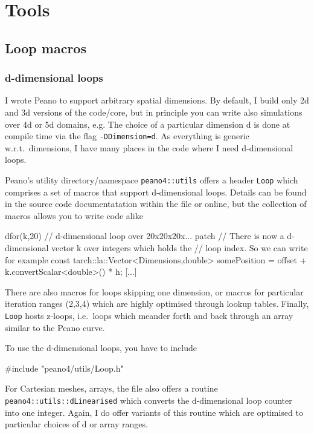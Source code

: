 \chapter{Tools}
\label{section:tools}


\section{Loop macros}

\subsection{d-dimensional loops}

I wrote Peano to support arbitrary spatial dimensions.
By default, I build only 2d and 3d versions of the code/core, but in principle
you can write also simulations over 4d or 5d domains, e.g.
The choice of a particular dimension d is done at compile time via the
flag \texttt{-DDimension=d}.
As everything is generic w.r.t.~dimensions, I have many places in the code where
I need d-dimensional loops.


Peano's utility directory/namespace \texttt{peano4::utils} offers a header
\texttt{Loop} which comprises a set of macros that support d-dimensional loops.
Details can be found in the source code documentatation within the file or
online, but the collection of macros allows you to write code alike

\begin{code}
  dfor(k,20) { // d-dimensional loop over 20x20x20x... patch
    // There is now a d-dimensional vector k over integers which holds the 
    // loop index. So we can write for example
    const tarch::la::Vector<Dimensions,double> somePosition = 
      offset + k.convertScalar<double>() * h;
    [...]
  }
\end{code}

\noindent
There are also macros for loops skipping one dimension, or macros for particular
iteration ranges (2,3,4) which are highly optimised through lookup tables.
Finally, \texttt{Loop} hosts z-loops, i.e.~loops which meander forth and back
through an array similar to the Peano curve.


To use the d-dimensional loops, you have to include
\begin{code}
#include "peano4/utils/Loop.h" 
\end{code}


For Cartesian meshes, arrays, the file also offers a routine
\texttt{peano4::utils::dLinearised} which converts the d-dimensional loop
counter into one integer.
Again, I do offer variants of this routine which are optimised to particular
choices of d or array ranges.

